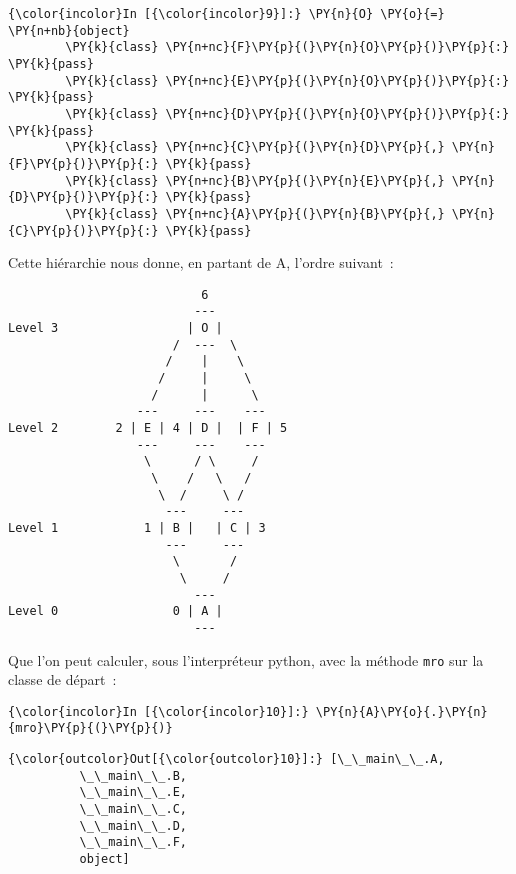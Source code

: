     \begin{Verbatim}[commandchars=\\\{\}]
{\color{incolor}In [{\color{incolor}9}]:} \PY{n}{O} \PY{o}{=} \PY{n+nb}{object}
        \PY{k}{class} \PY{n+nc}{F}\PY{p}{(}\PY{n}{O}\PY{p}{)}\PY{p}{:} \PY{k}{pass}
        \PY{k}{class} \PY{n+nc}{E}\PY{p}{(}\PY{n}{O}\PY{p}{)}\PY{p}{:} \PY{k}{pass}
        \PY{k}{class} \PY{n+nc}{D}\PY{p}{(}\PY{n}{O}\PY{p}{)}\PY{p}{:} \PY{k}{pass}
        \PY{k}{class} \PY{n+nc}{C}\PY{p}{(}\PY{n}{D}\PY{p}{,} \PY{n}{F}\PY{p}{)}\PY{p}{:} \PY{k}{pass}
        \PY{k}{class} \PY{n+nc}{B}\PY{p}{(}\PY{n}{E}\PY{p}{,} \PY{n}{D}\PY{p}{)}\PY{p}{:} \PY{k}{pass}
        \PY{k}{class} \PY{n+nc}{A}\PY{p}{(}\PY{n}{B}\PY{p}{,} \PY{n}{C}\PY{p}{)}\PY{p}{:} \PY{k}{pass}
\end{Verbatim}


    Cette hiérarchie nous donne, en partant de A, l'ordre suivant~:

    \begin{verbatim}
                           6
                          ---
Level 3                  | O |
                       /  ---  \
                      /    |    \
                     /     |     \
                    /      |      \
                  ---     ---    ---
Level 2        2 | E | 4 | D |  | F | 5
                  ---     ---    ---
                   \      / \     /
                    \    /   \   /
                     \  /     \ /
                      ---     ---
Level 1            1 | B |   | C | 3
                      ---     ---
                       \       /
                        \     /
                          ---
Level 0                0 | A |
                          ---
\end{verbatim}

    Que l'on peut calculer, sous l'interpréteur python, avec la méthode
\texttt{mro} sur la classe de départ~:

    \begin{Verbatim}[commandchars=\\\{\}]
{\color{incolor}In [{\color{incolor}10}]:} \PY{n}{A}\PY{o}{.}\PY{n}{mro}\PY{p}{(}\PY{p}{)}
\end{Verbatim}


\begin{Verbatim}[commandchars=\\\{\}]
{\color{outcolor}Out[{\color{outcolor}10}]:} [\_\_main\_\_.A,
          \_\_main\_\_.B,
          \_\_main\_\_.E,
          \_\_main\_\_.C,
          \_\_main\_\_.D,
          \_\_main\_\_.F,
          object]
\end{Verbatim}
            
